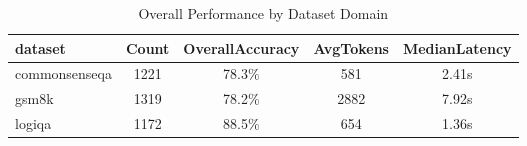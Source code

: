 \begin{table}
\caption{Overall Performance by Dataset Domain}
\label{tab:domain_perf}
\begin{tabular}{lcccc}
\toprule
dataset & Count & OverallAccuracy & AvgTokens & MedianLatency \\
\midrule
commonsenseqa & 1221 & 78.3\% & 581 & 2.41s \\
gsm8k & 1319 & 78.2\% & 2882 & 7.92s \\
logiqa & 1172 & 88.5\% & 654 & 1.36s \\
\bottomrule
\end{tabular}
\end{table}
